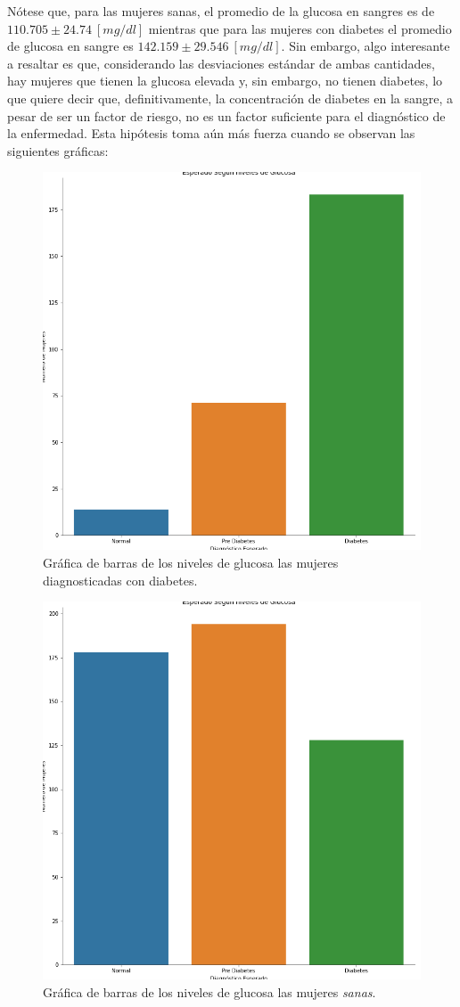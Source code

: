 \documentclass{article}
\begin{document}
Nótese que, para las mujeres sanas, el promedio de la glucosa en sangres es de $110.705\pm24.74\ [mg/dl]$ mientras que  para las mujeres con diabetes el promedio de glucosa en sangre es $142.159\pm29.546\ [mg/dl]$. Sin embargo, algo interesante a resaltar es que, considerando las desviaciones estándar de ambas cantidades, hay mujeres que tienen la glucosa elevada y, sin embargo, no tienen diabetes, lo que quiere decir que, definitivamente, la concentración de diabetes en la sangre, a pesar de ser un factor de riesgo, no es un factor suficiente para el diagnóstico de la enfermedad. Esta hipótesis toma aún más fuerza cuando se observan las siguientes gráficas:

\begin{figure}[H]
	\centering
	\includegraphics[width=0.65\linewidth]{glucosa_bar_diabetes.png}
	\caption{Gráfica de barras de los niveles de glucosa las mujeres diagnosticadas con diabetes.}%
	\label{fig:glucosa_bar_diabetes}
\end{figure}

\begin{figure}[H]
	\centering
	\includegraphics[width=0.65\linewidth]{glucosa_bar_sanas.png}
	\caption{Gráfica de barras de los niveles de glucosa las mujeres \emph{sanas}.}%
	\label{fig:glucosa_bar_sanas}
\end{figure}
\end{document}
